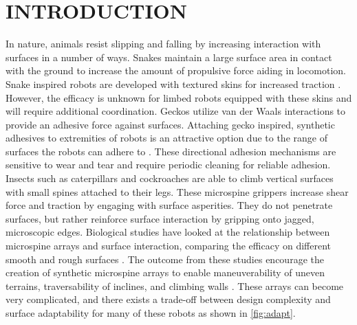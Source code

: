 \section{INTRODUCTION} 
In nature, animals resist slipping and falling by increasing interaction with surfaces in a number of ways. Snakes maintain a large surface area in contact with the ground to increase the amount of propulsive force aiding in locomotion. Snake inspired robots are developed with textured skins for increased traction \cite{liu_kirigami_2019, mckenna_toroidal_2008}. However, the efficacy is unknown for limbed robots equipped with these skins and will require additional coordination. Geckos utilize van der Waals interactions to provide an adhesive force against surfaces. Attaching gecko inspired, synthetic adhesives to extremities of robots is an attractive option due to the range of surfaces the robots can adhere to \cite{chen_testing_2022, hajj-ahmad_grasp_2023, han_climbing_2022, sangbae_kim_smooth_2008, sikdar_gecko-inspired_2022}. These directional adhesion mechanisms are sensitive to wear and tear and require periodic cleaning for reliable adhesion. Insects such as caterpillars and cockroaches are able to climb vertical surfaces with small spines attached to their legs. These microspine grippers increase shear force and traction by engaging with surface asperities. They do not penetrate surfaces, but rather reinforce surface interaction by gripping onto jagged, microscopic edges. Biological studies have looked at the relationship between microspine arrays and surface interaction, comparing the efficacy on different smooth and rough surfaces \cite{dai_roughness-dependent_2002}. The outcome from these studies encourage the creation of synthetic microspine arrays to enable maneuverability of uneven terrains, traversability of inclines, and climbing walls \cite{asbeck_scaling_2006, asbeck_designing_2012, iacoponi_simulation_2020, wang_design_2017, wang_palm_2016, jiang_stochastic_2018, sangbae_kim_spinybotii_2005, wang_spinyhand_2019, zi_mechanical_2023, asbeck_climbing_nodate, liu_novel_2019}. These arrays can become very complicated, and there exists a trade-off between design complexity and surface adaptability for many of these robots as shown in \Fig \ref{fig:adapt}.


